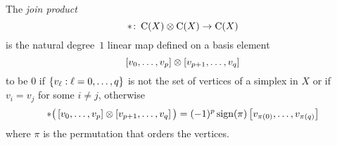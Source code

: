 
The \textit{join product}
\[
\ast \colon \operatorname{C}(X) \otimes \operatorname{C}(X) \to \operatorname{C}(X)
\]
is the natural degree~$1$ linear map defined on a basis element
\[
[v_0, \dots, v_p] \otimes [v_{p+1}, \dots, v_q]
\]
to be $0$ if $\{v_\ell : \ell = 0, \dots, q\}$ is not the set of vertices of a simplex in $X$ or if $v_i = v_j$ for some $i \neq j$,
otherwise
\[
\ast \big(\left[v_0, \dots, v_p \right] \otimes \left[v_{p+1}, \dots, v_q\right]\big) =
(-1)^{p} \operatorname{sign}(\pi) \left[v_{\pi(0)}, \dots, v_{\pi(q)}\right]
\]
where $\pi$ is the permutation that orders the vertices.

%	

